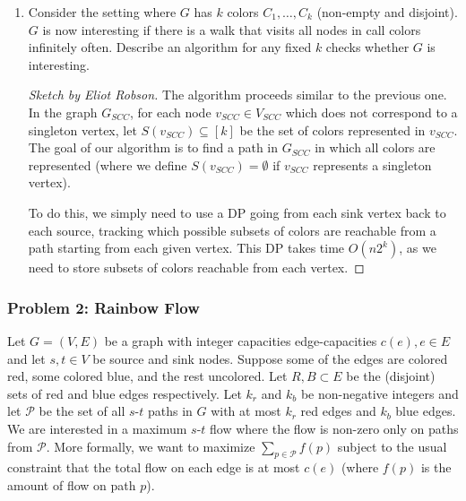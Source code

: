 \documentclass{article}
\newenvironment{sketch}[1]{\begin{proof}[Sketch by #1]}{\end{proof}}
\newenvironment{solution}[1]{\begin{proof}[Solution by #1]}{\end{proof}}
\begin{document}
\begin{enumerate}
    \begin{solution}{Eliot Robson}
        Consider the graph with nodes \(\set{r_1, r_2, b_1, b_2}\) where \(R = \set{r_1, r_2}\) and \(B = \set{b_1, b_2}\). This graph has edges for the 2-cycle between \(r_1\) and \(r_2\), and similarly for \(b_1\) and \(b_2\), and the edge \(r_2 \to b_1\). This graph is interesting, as we can visit the vertices \(r_1\) and \(r_2\) an arbitrary number of times before moving to the blue cycle and visit \(b_1\) and \(b_2\) an arbitrary number of times. However, it is not fascinating, as there are no walks with more than one color alternation.
    \end{solution}
	
	\item Consider the setting where \(G\) has \(k\) colors \(C_1, \dots, C_k\) (non-empty and disjoint). \(G\) is now interesting if there is a walk that visits all nodes in call colors infinitely often. Describe an algorithm for any fixed \(k\) checks whether \(G\) is interesting.
	
	\begin{sketch}{Eliot Robson}
		The algorithm proceeds similar to the previous one. In the graph \(G_{SCC}\), for each node \(v_{SCC} \in V_{SCC}\) which does not correspond to a singleton vertex, let \(S(v_{SCC}) \subseteq [k]\) be the set of colors represented in \(v_{SCC}\). The goal of our algorithm is to find a path in \(G_{SCC}\) in which all colors are represented (where we define \(S(v_{SCC}) = \emptyset\) if \(v_{SCC}\) represents a singleton vertex).
		
		To do this, we simply need to use a DP going from each sink vertex back to each source, tracking which possible subsets of colors are reachable from a path starting from each given vertex. This DP takes time \(O(n 2^k)\), as we need to store subsets of colors reachable from each vertex.
	\end{sketch}
\end{enumerate}

\subsubsection{Problem 2: Rainbow Flow}
Let \(G = (V,E)\) be a graph with integer capacities edge-capacities \(c(e), e \in E\) and let \(s,t \in V\) be source and sink nodes. Suppose some of the edges are colored red, some colored blue, and the rest uncolored. Let \(R, B \subset E\) be the (disjoint) sets of red and blue edges respectively. Let \(k_r\) and \(k_b\) be non-negative integers and let \(\mathcal{P}\) be the set of all \(s\)-\(t\) paths in \(G\) with at most \(k_r\) red edges and \(k_b\) blue edges. We are interested in a maximum \(s\)-\(t\) flow where the flow is non-zero only on paths from \(\mathcal{P}\). More formally, we want to maximize \(\sum_{p \in \mathcal{P}} f(p)\) subject to the usual constraint that the total flow on each edge is at most \(c(e)\) (where \(f(p)\) is the amount of flow on path \(p\)).
\end{document}
